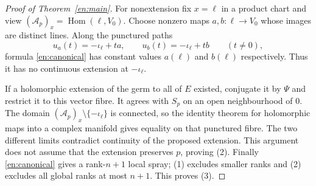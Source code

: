 \documentclass[12pt]{amsart}
\theoremstyle{definition}
\theoremstyle{remark}
\numberwithin{equation}{section}
\DeclareMathOperator{\Homop}{Hom}
\newcommand{\cA}{\mathcal{A}}
\begin{document}
\begin{proof}[Proof of Theorem~\ref{en:main}]
For nonextension fix $x=\ell$ in a product chart and view $(\cA_p)_x=\Homop(\ell,V_0)$. Choose nonzero maps $a,b:\ell\to V_0$ whose images are distinct lines. Along the punctured paths
\[
u_a(t)=-\iota_\ell+ta,\qquad
u_b(t)=-\iota_\ell+tb\qquad(t\ne0),
\]
formula \eqref{en:canonical} has constant values $a(\ell)$ and $b(\ell)$ respectively. Thus it has no continuous extension at $-\iota_\ell$.

If a holomorphic extension of the germ to all of $E$ existed, conjugate it by $\Psi$ and restrict it to this vector fibre. It agrees with $S_p$ on an open neighbourhood of $0$. The domain $(\cA_p)_x\setminus\{-\iota_\ell\}$ is connected, so the identity theorem for holomorphic maps into a complex manifold gives equality on that punctured fibre. The two different limits contradict continuity of the proposed extension. This argument does not assume that the extension preserves $p$, proving (2). Finally \eqref{en:canonical} gives a rank-$n+1$ local spray; (1) excludes smaller ranks and (2) excludes all global ranks at most $n+1$. This proves (3).
\end{proof}
\end{document}
